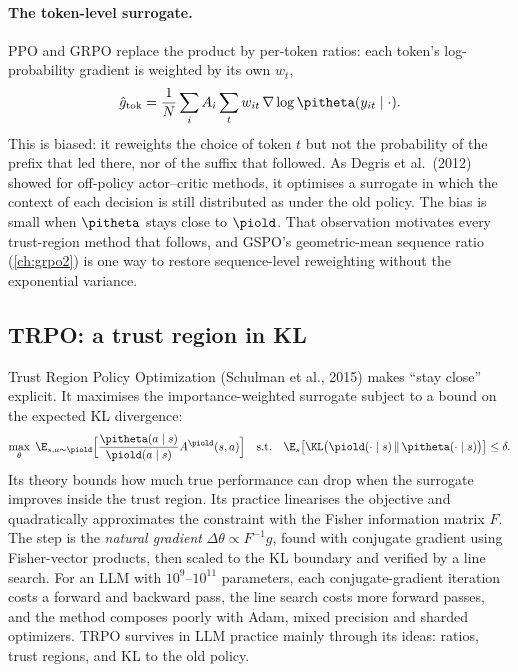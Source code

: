 \paragraph{The token-level surrogate.} PPO and GRPO replace the product by per-token ratios:
each token's log-probability gradient is weighted by its own $w_t$,
\[
\hat g_{\text{tok}}=\frac{1}{N}\sum_i A_i\sum_t w_{it}\,\nabla\log\pitheta(y_{it}\mid\cdot).
\]
This is biased: it reweights the choice of token $t$ but not the probability of the prefix
that led there, nor of the suffix that followed. As Degris et al.\ (2012) showed for
off-policy actor--critic methods, it optimises a surrogate in which the context of each
decision is still distributed as under the old policy. The bias is small when $\pitheta$
stays close to $\piold$. That observation motivates every trust-region method that follows,
and GSPO's geometric-mean sequence ratio (\cref{ch:grpo2}) is one way to restore
sequence-level reweighting without the exponential variance.

\subsection{TRPO: a trust region in KL}\label{sec:pg:trpo}

Trust Region Policy Optimization (Schulman et al., 2015) makes ``stay close'' explicit. It
maximises the importance-weighted surrogate subject to a bound on the expected KL divergence:
\begin{equation}
\max_\theta\;\E_{s,a\sim\piold}\Big[\frac{\pitheta(a\mid s)}{\piold(a\mid s)}A^{\piold}(s,a)\Big]
\quad\text{s.t.}\quad \E_s\big[\KL\big(\piold(\cdot\mid s)\,\|\,\pitheta(\cdot\mid s)\big)\big]\le\delta .
\end{equation}
Its theory bounds how much true performance can drop when the surrogate improves inside the
trust region. Its practice linearises the objective and quadratically approximates the
constraint with the Fisher information matrix $F$. The step is the \emph{natural gradient}
$\Delta\theta\propto F^{-1}g$, found with conjugate gradient using Fisher-vector products, then
scaled to the KL boundary and verified by a line search. For an LLM with $10^9$--$10^{11}$
parameters, each conjugate-gradient iteration costs a forward and backward pass, the line
search costs more forward passes, and the method composes poorly with Adam, mixed precision
and sharded optimizers. TRPO survives in LLM practice mainly through its ideas: ratios, trust
regions, and KL to the old policy.

